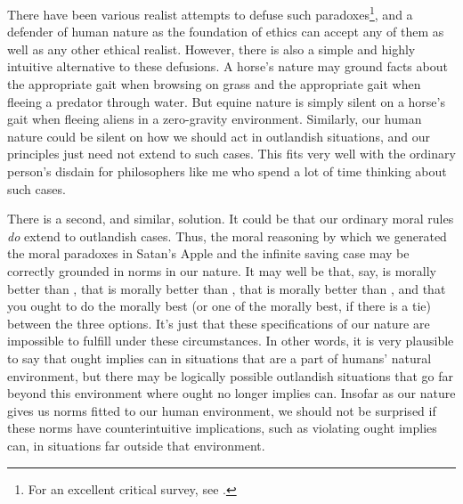 There have been various realist attempts to defuse such paradoxes\footnote{For an excellent critical survey,
see .}, and a defender of human nature as the
foundation of ethics can accept any of them as well as any other ethical realist. However, there is also a simple and highly intuitive 
alternative to these defusions. A horse's nature may ground facts about the appropriate gait when
browsing on grass and the appropriate gait when fleeing a predator through water. But equine nature
is simply silent on a horse's gait when fleeing aliens in a zero-gravity environment. Similarly,
our human nature could be silent on how we should act in outlandish situations, and our
principles just need not extend to such cases. This fits very well with the ordinary person's
disdain for philosophers like me who spend a lot of time thinking about such cases. 

There is a second, and similar, solution. It could be that our ordinary moral rules \textit{do} extend to outlandish
cases. Thus, the moral reasoning by which we generated the moral paradoxes in Satan's Apple and the 
infinite saving case may be correctly grounded in norms in our nature. It may well be that, say,
 is morally better than , that  is morally better than , 
that  is morally better than , and that you ought to do the morally best (or one
of the morally best, if there is a tie) between the three options. It's just that these specifications of 
our nature are impossible to fulfill under these circumstances. In other words, it is very plausible to
say that ought implies can in situations that are a part of humans' natural environment, but there may be
logically possible outlandish situations that go far beyond this environment where ought no longer implies can. 
Insofar as our nature gives us norms fitted to our human environment, we should not be surprised if these norms
have counterintuitive implications, such as violating ought implies can, in situations far outside that environment.

